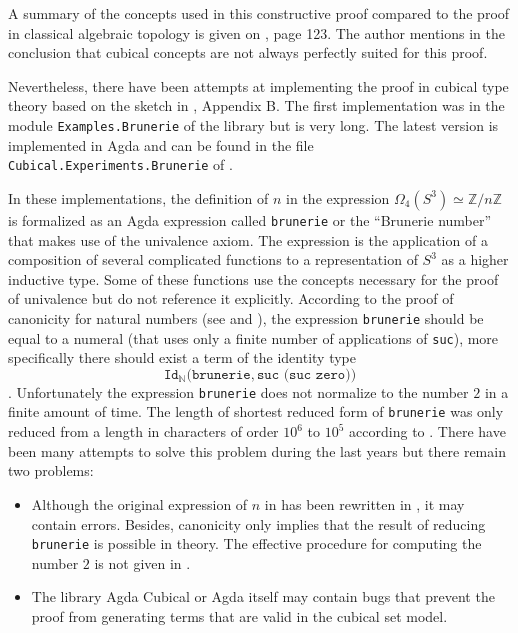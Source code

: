 \documentclass[12pt,a4paper,twoside,xetex]{book}
\begin{document}
A summary of the concepts used in this constructive proof compared to the proof in classical algebraic topology is given on \cite{Brunerie2016}, page 123. The author mentions in the conclusion that cubical concepts are not always perfectly suited for this proof. 

Nevertheless, there have been attempts at implementing the proof in cubical type theory based on the sketch in \cite{Brunerie2016}, Appendix B. The first implementation was in the module \texttt{Examples.Brunerie} of the library \cite{Moertberg2015} but is very long. The latest version is implemented in Agda and can be found in the file  \texttt{Cubical.Experiments.Brunerie} of \cite{Moertberg2018}. 

In these implementations, the definition of  $n$ in the expression $\Omega_4(S^3) \simeq \mathbb{Z}/n\mathbb{Z}$ is formalized as an Agda expression called \texttt{brunerie} or the ``Brunerie number'' that makes use of the univalence axiom. The expression is the application of a composition of several complicated functions to a representation of $S^3$ as a higher inductive type. Some of these functions use the concepts necessary for the proof of univalence but do not reference it explicitly. According to the proof of canonicity for natural numbers (see \cite{Huber2017} and \cite{Coquand2019}), the expression \texttt{brunerie} should be equal to a numeral (that uses only a finite number of applications of \texttt{suc}),  more specifically there should exist a term of the identity type $$\texttt{Id}_{\mathbb{N}}(\texttt{brunerie}, \texttt{suc (suc zero))}$$. Unfortunately the expression \texttt{brunerie} does not normalize to the number $2$ in a finite amount of time. The length of shortest reduced form of  \texttt{brunerie} was  only reduced from a length in characters of order $10^6$ to $10^5$ according to \cite{Brunerie2018}. There have been many attempts to solve this problem during the last years but there remain two problems:
\begin{itemize}
\item Although the original expression of $n$ in \cite{Moertberg2015} has been rewritten in \cite{Moertberg2018}, it may contain errors. Besides, canonicity only implies that the result of reducing \texttt{brunerie} is possible in theory. The effective procedure for computing the number $2$ is not given in \cite{Coquand2019}.
\item The library Agda Cubical or Agda itself may contain bugs that prevent the proof from generating terms that are valid in the cubical set model.
\end{itemize}
\end{document}
